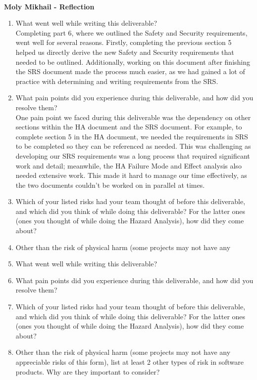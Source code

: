 \documentclass{article}
\begin{document}
\\
\textbf{Moly Mikhail - Reflection}
\begin{enumerate}
    \item What went well while writing this deliverable? \\[1ex]
    Completing part 6, where we outlined the Safety and Security requirements, 
    went well for several reasons. Firstly, completing the previous section 5 helped us directly derive the new Safety and
    Security requirements that needed to be outlined. Additionally, working on this document after finishing the SRS
    document made the process much easier, as we had gained a lot of practice with determining and writing requirements from the SRS. 
    \item What pain points did you experience during this deliverable, and how
    did you resolve them?\\[1ex]
    One pain point we faced during this deliverable was the dependency on other sections within the 
    HA document and the SRS document. For example, to complete section 5 in the HA document, we needed
    the requirements in SRS to be completed so they can be referenced as needed. This was challenging as 
    developing our SRS requirements was a long process that required significant work and detail; 
    meanwhile, the HA Failure Mode and Effect analysis also needed extensive work.  
    This made it hard to manage our time effectively, as the two documents couldn’t be worked on in parallel at times. 
    \item Which of your listed risks had your team thought of before this
    deliverable, and which did you think of while doing this deliverable? For
    the latter ones (ones you thought of while doing the Hazard Analysis), how
    did they come about?\\[1ex]
    \item Other than the risk of physical harm (some projects may not have any
  \item What went well while writing this deliverable?
  \item What pain points did you experience during this deliverable, and how
    did you resolve them?
  \item Which of your listed risks had your team thought of before this
    deliverable, and which did you think of while doing this deliverable? For
    the latter ones (ones you thought of while doing the Hazard Analysis), how
    did they come about?
  \item Other than the risk of physical harm (some projects may not have any
    appreciable risks of this form), list at least 2 other types of risk in
    software products. Why are they important to consider?\\[1ex]
\end{enumerate}
\end{document}
